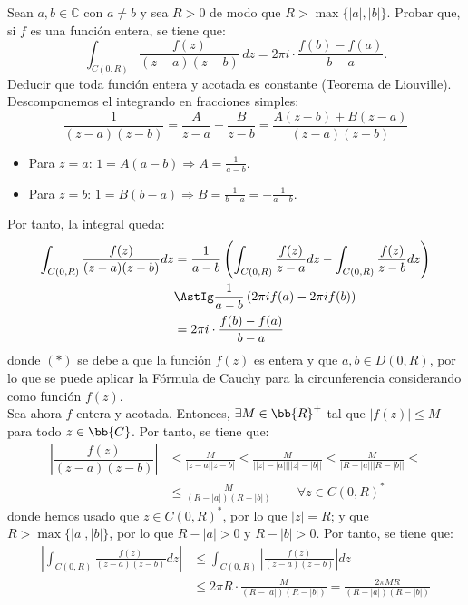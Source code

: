\documentclass[12pt]{article}
\begin{document}
    \begin{ejercicio}[3 puntos]
        Sean $a,b \in \mathbb{C}$ con $a \neq b$ y sea $R > 0$ de modo que $R > \max\{|a|,|b|\}$. Probar que, si $f$ es una función entera, se tiene que:
        \[
            \int_{C(0,R)} \dfrac{f(z)}{(z-a)(z-b)} \, dz = 2\pi i \cdot \dfrac{f(b) - f(a)}{b-a}.
        \]
        Deducir que toda función entera y acotada es constante (Teorema de Liouville).\\

        Descomponemos el integrando en fracciones simples:
    \begin{equation*}
        \frac{1}{(z-a)(z-b)} = \frac{A}{z-a} + \frac{B}{z-b} = \frac{A(z-b)+B(z-a)}{(z-a)(z-b)}
    \end{equation*}
    \begin{itemize}
        \item Para $z=a$: $1=A(a-b)\Longrightarrow A=\frac{1}{a-b}$.
        \item Para $z=b$: $1=B(b-a)\Longrightarrow B=\frac{1}{b-a}=-\frac{1}{a-b}$.
    \end{itemize}

    Por tanto, la integral queda:
    \begin{align*}
        \int_{C(0,R)} \frac{f(z)}{(z-a)(z-b)}dz &= \frac{1}{a-b}\left(\int_{C(0,R)} \frac{f(z)}{z-a}dz - \int_{C(0,R)} \frac{f(z)}{z-b}dz\right)\\
        &\AstIg \frac{1}{a-b}\left(2\pi i f(a) - 2\pi i f(b)\right)\\
        &= 2\pi i \cdot \frac{f(b)-f(a)}{b-a}
    \end{align*}
    donde $(\ast)$ se debe a que la función $f(z)$ es entera y que $a,b\in D(0,R)$, por lo que se puede aplicar la Fórmula de Cauchy para la circunferencia considerando como función $f(z)$.\\

    Sea ahora $f$ entera y acotada. Entonces, $\exists M\in \bb{R}^+$ tal que $|f(z)|\leq M$ para todo $z\in \bb{C}$. Por tanto, se tiene que:
    \begin{align*}
        \left|\dfrac{f(z)}{(z-a)(z-b)}\right| &\leq \frac{M}{|z-a||z-b|}
        \leq \frac{M}{\left||z| - |a|\right|\left||z| - |b|\right|}
        \leq \frac{M}{\left|R - |a|\right|\left|R - |b|\right|}
        \leq\\&\leq  \frac{M}{(R-|a|)(R-|b|)}\qquad \forall z\in C(0,R)^*
    \end{align*}
    donde hemos usado que $z\in C(0,R)^*$, por lo que $|z|=R$; y que $R>\max\{|a|,|b|\}$, por lo que $R-|a|>0$ y $R-|b|>0$. Por tanto, se tiene que:
    \begin{align*}
        \left|\int_{C(0,R)} \frac{f(z)}{(z-a)(z-b)}dz\right| &\leq \int_{C(0,R)} \left|\frac{f(z)}{(z-a)(z-b)}\right|dz\\
        &\leq 2\pi R \cdot \frac{M}{(R-|a|)(R-|b|)} = \frac{2\pi M R}{(R-|a|)(R-|b|)}
    \end{align*}


\end{ejercicio}
\end{document}
